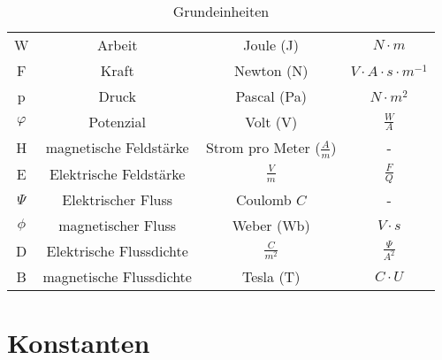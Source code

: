 \begin{table}[!htb]
\begin{tabular}{|c|c|c|c|}
        W                       & Arbeit                    & Joule (J)                         & $N \cdot m$                        \\
        F                       & Kraft                     & Newton (N)                        & $V \cdot A \cdot s \cdot m^{-1}$   \\ 
        p                       & Druck                     & Pascal (Pa)                       & $N \cdot m^2$                      \\
        $\varphi$               & Potenzial                 & Volt (V)                          & $\frac{W}{A}$                      \\
        \hline
        H                       & magnetische Feldstärke    & Strom pro Meter ($\frac{A}{m}$)   & -                                  \\ 
        E                       & Elektrische Feldstärke    & $\frac{V}{m}$                     & $\frac{F}{Q}$                      \\
        $\Psi$                  & Elektrischer Fluss        & Coulomb $C$                       & -                                  \\
        $\phi$                  & magnetischer Fluss        & Weber (Wb)                        & $V \cdot s$                        \\
        D                       & Elektrische Flussdichte   & $\frac{C}{m^2}$                   & $\frac{\Psi}{A^2}$                 \\
        B                       & magnetische Flussdichte   & Tesla (T)                         & $C \cdot U$                        \\
        \hline
    \end{tabular}
    \caption{Grundeinheiten}
\end{table}

\newpage

\section{Konstanten}

